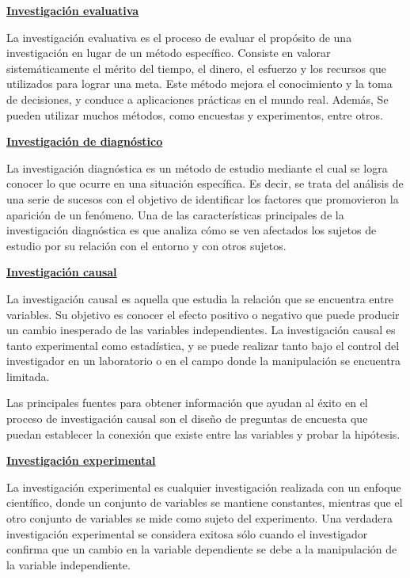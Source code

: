 \documentclass[12pt, a4paper, nofontenc, numbers=endperiod]{apa7}
\begin{document}
{\setlength{\parindent}{0cm}\textbf{\underline{Investigación evaluativa}} 

		\setlength{\parindent}{1.27cm}La investigación evaluativa es el proceso de evaluar el propósito de una investigación en lugar de un método específico. Consiste en valorar sistemáticamente el mérito del tiempo, el dinero, el esfuerzo y los recursos que utilizados para lograr una meta. Este método mejora el conocimiento y la toma de decisiones, y conduce a aplicaciones prácticas en el mundo real. Además, Se pueden utilizar muchos métodos, como encuestas y experimentos, entre otros.
		
		
\setlength{\parindent}{0cm}\textbf{\underline{Investigación de diagnóstico}} 		

\setlength{\parindent}{1.27cm}La investigación diagnóstica es un método de estudio mediante el cual se logra conocer lo que ocurre en una situación específica. Es decir, se trata del análisis de una serie de sucesos con el objetivo de identificar los factores que promovieron la aparición de un fenómeno. Una de las características principales de la investigación diagnóstica es que analiza cómo se ven afectados los sujetos de estudio por su relación con el entorno y con otros sujetos.
				
\setlength{\parindent}{0cm}\textbf{\underline{Investigación causal}} 				
	
\setlength{\parindent}{1.27cm}La investigación causal es aquella que estudia la relación que se encuentra entre variables. Su objetivo es conocer el efecto positivo o negativo que puede producir un cambio inesperado de las variables independientes. La investigación causal es tanto experimental como estadística, y se puede realizar tanto bajo el control del investigador en un laboratorio o en el campo donde la manipulación se encuentra limitada.
		
		\setlength{\parindent}{1.27cm}Las principales fuentes para obtener información que ayudan al éxito en el proceso de investigación causal son el diseño de preguntas de encuesta que puedan establecer la conexión que existe entre las variables y probar la hipótesis.

\setlength{\parindent}{0cm}\textbf{\underline{Investigación experimental}} 
				
\setlength{\parindent}{1.27cm}La investigación experimental es cualquier investigación realizada con un enfoque científico, donde un conjunto de variables se mantiene constantes, mientras que el otro conjunto de variables se mide como sujeto del experimento. Una verdadera investigación experimental se considera exitosa sólo cuando el investigador confirma que un cambio en la variable dependiente se debe a la manipulación de la variable independiente.

}
\end{document}
